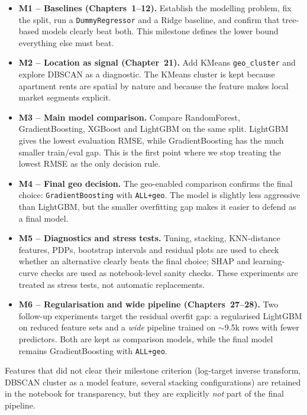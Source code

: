 \documentclass[11pt,a4paper]{article}
\begin{document}
\begin{itemize}
    \item \textbf{M1 -- Baselines (Chapters~1--12).} Establish the modelling problem, fix the split, run a \texttt{DummyRegressor} and a Ridge baseline, and confirm that tree-based models clearly beat both. This milestone defines the lower bound everything else must beat.
    \item \textbf{M2 -- Location as signal (Chapter~21).} Add KMeans \texttt{geo\_cluster} and explore DBSCAN as a diagnostic. The KMeans cluster is kept because apartment rents are spatial by nature and because the feature makes local market segments explicit.
    \item \textbf{M3 -- Main model comparison.} Compare RandomForest, GradientBoosting, XGBoost and LightGBM on the same split. LightGBM gives the lowest evaluation RMSE, while GradientBoosting has the much smaller train/eval gap. This is the first point where we stop treating the lowest RMSE as the only decision rule.
    \item \textbf{M4 -- Final geo decision.} The geo-enabled comparison confirms the final choice: \texttt{GradientBoosting} with \texttt{ALL+geo}. The model is slightly less aggressive than LightGBM, but the smaller overfitting gap makes it easier to defend as a final model.
    \item \textbf{M5 -- Diagnostics and stress tests.} Tuning, stacking, KNN-distance features, PDPs, bootstrap intervals and residual plots are used to check whether an alternative clearly beats the final choice; SHAP and learning-curve checks are used as notebook-level sanity checks. These experiments are treated as stress tests, not automatic replacements.
    \item \textbf{M6 -- Regularisation and wide pipeline (Chapters~27--28).} Two follow-up experiments target the residual overfit gap: a regularised LightGBM on reduced feature sets and a \emph{wide} pipeline trained on $\sim$9.5k rows with fewer predictors. Both are kept as comparison models, while the final model remains GradientBoosting with \texttt{ALL+geo}.
\end{itemize}

Features that did not clear their milestone criterion (log-target inverse transform, DBSCAN cluster as a model feature, several stacking configurations) are retained in the notebook for transparency, but they are explicitly \emph{not} part of the final pipeline.
\end{document}
